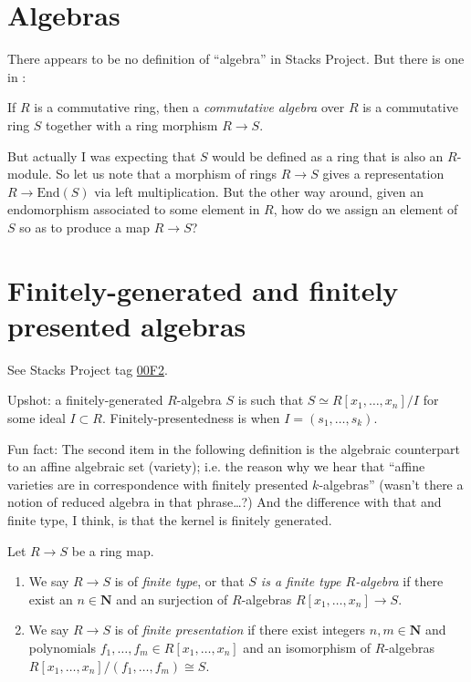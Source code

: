 \noindent


\section{Algebras}
\label{section-algebras}

\noindent
There appears to be no definition of ``algebra''
in Stacks Project.
But there is one in \cite{Eisenbud}:

\begin{definition}
\label{definition-algebra}
If $R$ is a commutative ring,
then a {\it commutative algebra} over $R$ 
is a commutative ring $S$ together
with a ring morphism $R \to S$.
\end{definition}

\noindent
But actually I was expecting that 
$S$ would be defined as 
a ring that is also an $R$-module.
So let us note that a morphism of rings
$R \to S$ gives a representation
$R \to \text{End}(S)$ via left multiplication.
But the other way around,
given an endomorphism associated
to some element in $R$,
how do we assign an element of $S$
so as to produce a map $R \to S$?

\section{Finitely-generated and finitely presented algebras}
\label{section-finitely-presented-generated}

\noindent
See Stacks Project tag \href{https://stacks.math.columbia.edu/tag/00F2}{00F2}.

Upshot: a finitely-generated $R$-algebra $S$ is such that
$S \simeq R[x_1,\ldots,x_n]/I$ for some ideal $I \subset R$.
Finitely-presentedness is when $I = (s_1,\ldots,s_k)$.

Fun fact: The second item in the following definition
is the algebraic counterpart to an
affine algebraic set (variety);
i.e. the reason why we hear that
``affine varieties are in correspondence
with finitely presented $k$-algebras''
(wasn't there a notion of reduced algebra in that phrase…?)
And the difference with that and finite type,
I think,
is that the kernel is finitely generated.

\begin{definition}
\label{definition-finite-type}
Let $R \to S$ be a ring map.
\begin{enumerate}
\item We say $R \to S$ is of {\it finite type}, or that {\it $S$ is a finite
type $R$-algebra} if there exist an $n \in \mathbf{N}$ and an surjection
of $R$-algebras $R[x_1, \ldots, x_n] \to S$.
\item We say $R \to S$ is of {\it finite presentation} if there
exist integers $n, m \in \mathbf{N}$ and polynomials
$f_1, \ldots, f_m \in R[x_1, \ldots, x_n]$
and an isomorphism of $R$-algebras
$R[x_1, \ldots, x_n]/(f_1, \ldots, f_m) \cong S$.
\end{enumerate}
\end{definition}

